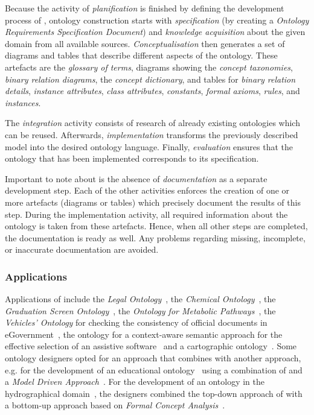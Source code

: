 Because the activity of \emph{planification} is finished by defining the development process of \methontology, ontology construction starts with \emph{specification} (by creating a \emph{Ontology Requirements Specification Document}) and \emph{knowledge acquisition} about the given domain from all available sources. \emph{Conceptualisation} then generates a set of diagrams and tables that describe different aspects of the ontology. These artefacts are the \emph{glossary of terms}, diagrams showing the \emph{concept taxonomies}, \emph{binary relation diagrams}, the \emph{concept dictionary}, and tables for \emph{binary relation details}, \emph{instance attributes}, \emph{class attributes}, \emph{constants}, \emph{formal axioms}, \emph{rules}, and \emph{instances}. %

The \emph{integration} activity consists of research of already existing ontologies which can be reused. Afterwards, \emph{implementation} transforms the previously described model into the desired ontology language. Finally, \emph{evaluation} ensures that the ontology that has been implemented corresponds to its specification.

Important to note about \methontology is the absence of \emph{documentation} as a separate development step. Each of the other activities enforces the creation of one or more artefacts (diagrams or tables) which precisely document the results of this step. During the implementation activity, all required information about the ontology is taken from these artefacts. Hence, when all other steps are completed, the documentation is ready as well. Any problems regarding missing, incomplete, or inaccurate documentation are avoided.

\subsubsection{Applications}

Applications of \methontology include the \emph{Legal Ontology}~\cite{MethontologyLegal}, the \emph{Chemical Ontology}~\cite{MethontologyChemical}, the \emph{Graduation Screen Ontology}~\cite{GraduationScreenOntology}, the \emph{Ontology for Metabolic Pathways}~\cite{MetabolicPathways}, the \emph{Vehicles' Ontology} for checking the consistency of official documents in eGovernment~\cite{VehiclesOntology}, the ontology for a context-aware semantic approach for the effective selection of an assistive software~\cite{AssistiveSoftware} and a cartographic ontology~\cite{CartographicOntology}. Some ontology designers opted for an approach that combines \methontology with another approach, e.g. for the development of an educational ontology~\cite{EducationalOntology} using a combination of \methontology and a \emph{Model Driven Approach}~\cite{ModelDrivenApproach}.
For the development of an ontology in the hydrographical domain~\cite{HydrographicalOntology}, the designers combined the top-down approach of \methontology with a bottom-up approach based on \emph{Formal Concept Analysis}~\cite{FormalConceptAnalysis}.

